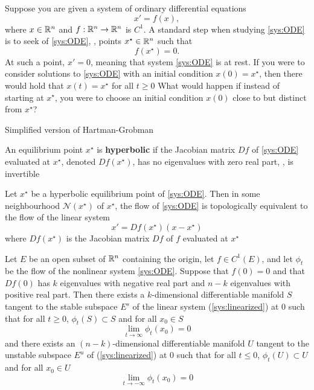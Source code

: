 \documentclass[aspectratio=169]{beamer}
\begin{document}
\begin{frame}
Suppose you are given a system of ordinary differential equations
\begin{equation}\label{sys:ODE}
x'=f(x),
\end{equation}
where $x\in\mathbb{R}^n$ and $f:\mathbb{R}^n\to\mathbb{R}^n$ is $C^1$. A standard step when studying \eqref{sys:ODE}  is to seek  of \eqref{sys:ODE}, \ie, points $x^\star\in\mathbb{R}^n$ such that
\begin{equation}\label{eq:equilibrium}
f(x^\star)=0.
\end{equation}
At such a point, $x'=0$, meaning that system \eqref{sys:ODE} is at rest. If you were to consider solutions to \eqref{sys:ODE} with an initial condition $x(0)=x^\star$, then there would hold that $x(t)=x^\star$ for all $t\geq 0$
\vfill
What would happen if instead of starting at $x^\star$, you were to choose an initial condition $x(0)$ close to but distinct from $x^\star$?
\end{frame}

\begin{frame}{Simplified version of Hartman-Grobman}
\begin{definition}
An equilibrium point $x^\star$ is \textbf{hyperbolic} if the Jacobian matrix $Df$ of \eqref{sys:ODE} evaluated at $x^\star$, denoted $Df(x^\star)$, has no eigenvalues with zero real part, \ie, is invertible
\end{definition}
\vfill
\begin{theorem}\label{th:HartmanGrobman}
Let $x^\star$ be a hyperbolic equilibrium point of \eqref{sys:ODE}.
Then in some neighbourhood $\mathcal{N}(x^\star)$ of $x^\star$, the flow of \eqref{sys:ODE} is topologically equivalent to the flow of the linear system 
\begin{equation}\label{sys:linearized}
x'=Df(x^\star)(x-x^\star)
\end{equation} 
where $Df(x^\star)$ is the Jacobian matrix $Df$ of $f$ evaluated at $x^\star$
\end{theorem}
\end{frame}

\begin{frame}
\begin{theorem}\label{th:stable_manifold}
Let $E$ be an open subset of $\mathbb{R}^n$ containing the origin, let $f\in
C^1(E)$, and let $\phi_t$ be the flow of the nonlinear system
\eqref{sys:ODE}. Suppose that $f(0)=0$ and that $Df(0)$ has $k$
eigenvalues with negative real part and $n-k$ eigenvalues with
positive real part. Then there exists a $k$-dimensional differentiable
manifold $S$ tangent to the stable subspace $E^s$ of the linear system
(\ref{sys:linearized}) at 0 such that for all $t\geq 0$,
$\phi_t(S)\subset S$ and for all $x_0\in S$
\[
\lim_{t\to\infty} \phi_t(x_0)=0
\]
and there exists an $(n-k)$-dimensional differentiable manifold $U$
tangent to the unstable subspace $E^u$ of (\ref{sys:linearized}) at 0
such that for all $t\leq 0$, $\phi_t(U)\subset U$ and for all $x_0\in
U$
\[
\lim_{t\to-\infty}\phi_t(x_0)=0
\]
\end{theorem}
\end{frame}
\end{document}
